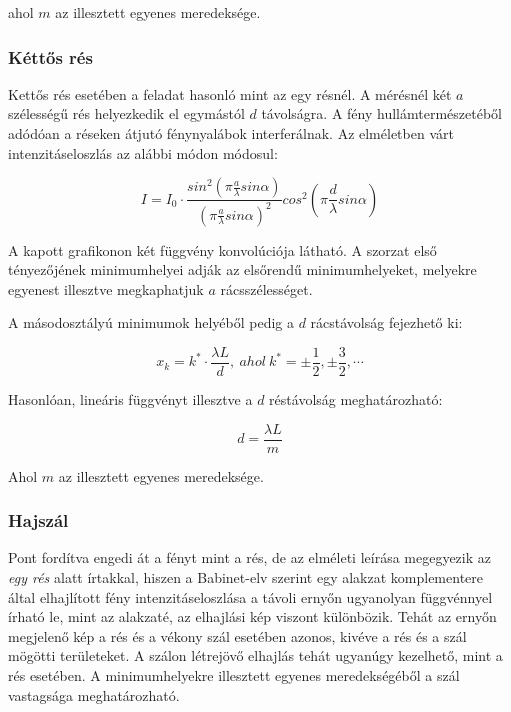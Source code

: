 \documentclass[a4paper,11pt]{article}
\begin{document}
ahol $m$ az illesztett egyenes meredeksége.

\subsubsection{Kéttős rés}
\indent Kettős rés esetében a feladat hasonló mint az egy résnél. A mérésnél két $a$ szélességű rés helyezkedik el egymástól $d$ távolságra. A fény hullámtermészetéből adódóan a réseken átjutó fénynyalábok interferálnak. Az elméletben várt intenzitáseloszlás az alábbi módon módosul:

\begin{equation}
I=I_0 \cdot \frac{sin^2(\pi\frac{a}{\lambda}sin\alpha)}{(\pi\frac{a}{\lambda}sin\alpha)^2} cos^2(\pi \frac{d}{\lambda}sin\alpha)
\end{equation}

A kapott grafikonon két függvény konvolúciója látható. A szorzat első tényezőjének minimumhelyei adják az elsőrendű minimumhelyeket, melyekre egyenest illesztve megkaphatjuk $a$ rácsszélességet. 

A másodosztályú minimumok helyéből pedig a $d$ rácstávolság fejezhető ki:

\begin{equation}
x_k=k^{*}\cdot\frac{\lambda L}{d},~ahol~k^{*}=\pm\frac{1}{2},\pm\frac{3}{2},\cdots
\end{equation}

Hasonlóan, lineáris függvényt illesztve a $d$ réstávolság meghatározható:

\begin{equation}
d=\frac{\lambda L}{m}
\end{equation}

Ahol $m$ az illesztett egyenes meredeksége.

\subsubsection{Hajszál}
Pont fordítva engedi át a fényt mint a rés, de az elméleti leírása megegyezik az \textit{egy rés} alatt írtakkal, hiszen a Babinet-elv szerint egy alakzat komplementere által elhajlított fény intenzitáseloszlása a távoli ernyőn ugyanolyan függvénnyel írható le, mint az alakzaté, az elhajlási kép viszont különbözik. Tehát az ernyőn megjelenő kép a rés és a vékony szál esetében azonos, kivéve a rés és a szál mögötti területeket. A szálon létrejövő elhajlás tehát ugyanúgy kezelhető, mint a rés esetében. A minimumhelyekre illesztett egyenes meredekségéből a szál vastagsága meghatározható.
\end{document}
